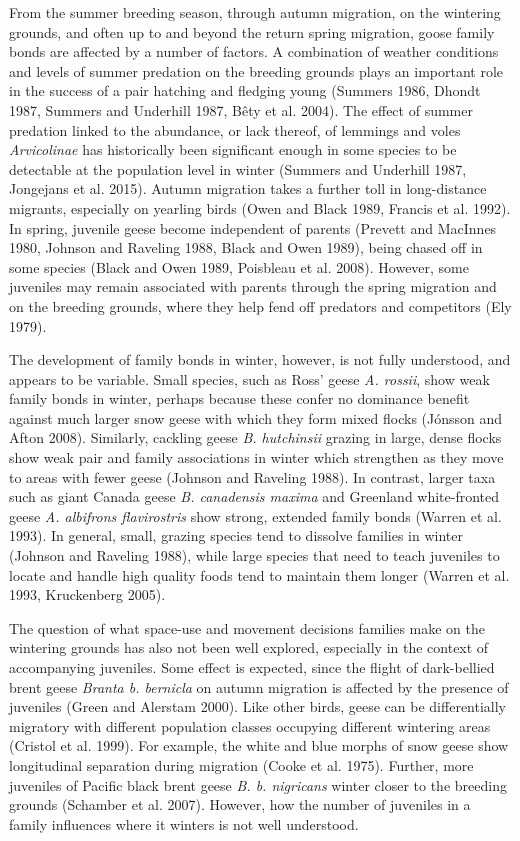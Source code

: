 \documentclass[10pt,twocolumn]{paper}
\begin{document}
From the summer breeding season, through autumn migration, on the
wintering grounds, and often up to and beyond the return spring
migration, goose family bonds are affected by a number of factors. A
combination of weather conditions and levels of summer predation on the
breeding grounds plays an important role in the success of a pair
hatching and fledging young (Summers 1986, Dhondt 1987, Summers and
Underhill 1987, Bêty et al. 2004). The effect of summer predation linked
to the abundance, or lack thereof, of lemmings and voles
\emph{Arvicolinae} has historically been significant enough in some
species to be detectable at the population level in winter (Summers and
Underhill 1987, Jongejans et al. 2015). Autumn migration takes a further
toll in long-distance migrants, especially on yearling birds (Owen and
Black 1989, Francis et al. 1992). In spring, juvenile geese become
independent of parents (Prevett and MacInnes 1980, Johnson and Raveling
1988, Black and Owen 1989), being chased off in some species (Black and
Owen 1989, Poisbleau et al. 2008). However, some juveniles may remain
associated with parents through the spring migration and on the breeding
grounds, where they help fend off predators and competitors (Ely 1979).

The development of family bonds in winter, however, is not fully
understood, and appears to be variable. Small species, such as Ross'
geese \emph{A. rossii}, show weak family bonds in winter, perhaps
because these confer no dominance benefit against much larger snow geese
with which they form mixed flocks (Jónsson and Afton 2008). Similarly,
cackling geese \emph{B. hutchinsii} grazing in large, dense flocks show
weak pair and family associations in winter which strengthen as they
move to areas with fewer geese (Johnson and Raveling 1988). In contrast,
larger taxa such as giant Canada geese \emph{B. canadensis maxima} and
Greenland white-fronted geese \emph{A. albifrons flavirostris} show
strong, extended family bonds (Warren et al. 1993). In general, small,
grazing species tend to dissolve families in winter (Johnson and
Raveling 1988), while large species that need to teach juveniles to
locate and handle high quality foods tend to maintain them longer
(Warren et al. 1993, Kruckenberg 2005).

The question of what space-use and movement decisions families make on
the wintering grounds has also not been well explored, especially in the
context of accompanying juveniles. Some effect is expected, since the
flight of dark-bellied brent geese \emph{Branta b. bernicla} on autumn
migration is affected by the presence of juveniles (Green and Alerstam
2000). Like other birds, geese can be differentially migratory with
different population classes occupying different wintering areas
(Cristol et al. 1999). For example, the white and blue morphs of snow
geese show longitudinal separation during migration (Cooke et al. 1975).
Further, more juveniles of Pacific black brent geese \emph{B. b.
nigricans} winter closer to the breeding grounds (Schamber et al. 2007).
However, how the number of juveniles in a family influences where it
winters is not well understood.
\end{document}
